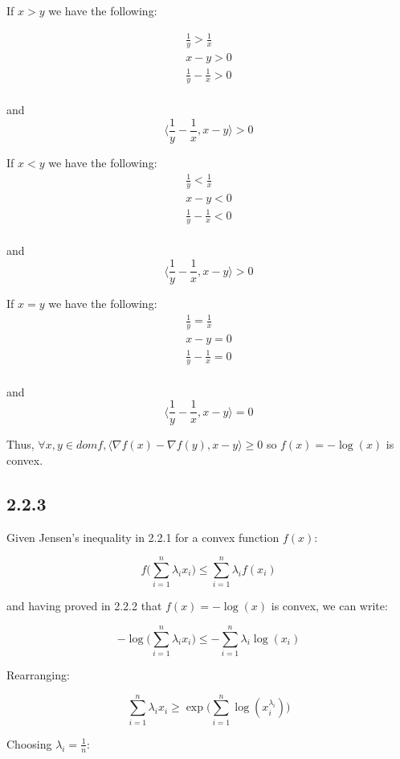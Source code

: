 \documentclass[12pt]{article}
\begin{document}
If $x>y$ we have the following:

\begin{gather*}
    \frac{1}{y} > \frac{1}{x}\\
    x-y>0\\
    \frac{1}{y} - \frac{1}{x} > 0\\
\end{gather*}

and
\[\langle \frac{1}{y}-\frac{1}{x}, x-y \rangle > 0\]

If $x<y$ we have the following:
\begin{gather*}
    \frac{1}{y} < \frac{1}{x}\\
    x-y<0\\
    \frac{1}{y} - \frac{1}{x} < 0\\
\end{gather*}

and
\[\langle \frac{1}{y}-\frac{1}{x}, x-y \rangle > 0\]

If $x=y$ we have the following:
\begin{gather*}
    \frac{1}{y} = \frac{1}{x}\\
    x-y=0\\
    \frac{1}{y} - \frac{1}{x} = 0\\
\end{gather*}

and
\[\langle \frac{1}{y}-\frac{1}{x}, x-y \rangle = 0\]

Thus, $\forall x, y \in dom f, \langle \nabla f(x) - \nabla f(y), x-y \rangle \geq 0$ so $f(x) = -\log(x)$ is convex. \square

\subsection*{2.2.3}

Given Jensen's inequality in 2.2.1 for a convex function $f(x)$:

\[f\bigg(\sum_{i=1}^n \lambda_i x_i\bigg) \leq \sum_{i=1}^n \lambda_i f(x_i)\]

and having proved in 2.2.2 that $f(x) = -\log(x)$ is convex, we can write:

\[-\log\bigg(\sum_{i=1}^n \lambda_i x_i\bigg) \leq - \sum_{i=1}^n \lambda_i \log(x_i)\]

Rearranging:

\[\sum_{i=1}^n \lambda_i x_i \geq \exp \bigg(\sum_{i=1}^n \log(x_i^{\lambda_i}) \bigg)\]


Choosing $\lambda_i = \frac{1}{n}$:
\end{document}
